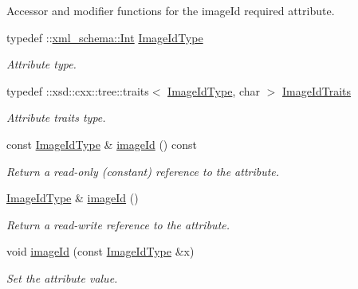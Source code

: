 Accessor and modifier functions for the imageId required attribute. \begin{DoxyCompactItemize}
\item 
\hypertarget{classopenstack_1_1xml_1_1Rebuild_a8896fc0d560d689eedce7af71136c4dc}{
typedef ::\hyperlink{namespacexml__schema_a12d975a13061c938969b2b5143e97645}{xml\_\-schema::Int} \hyperlink{classopenstack_1_1xml_1_1Rebuild_a8896fc0d560d689eedce7af71136c4dc}{ImageIdType}}
\label{classopenstack_1_1xml_1_1Rebuild_a8896fc0d560d689eedce7af71136c4dc}

\begin{DoxyCompactList}\small\item\em Attribute type. \item\end{DoxyCompactList}\item 
\hypertarget{classopenstack_1_1xml_1_1Rebuild_a8d342733a631b55058f8ddea8ba63561}{
typedef ::xsd::cxx::tree::traits$<$ \hyperlink{classopenstack_1_1xml_1_1Rebuild_a8896fc0d560d689eedce7af71136c4dc}{ImageIdType}, char $>$ \hyperlink{classopenstack_1_1xml_1_1Rebuild_a8d342733a631b55058f8ddea8ba63561}{ImageIdTraits}}
\label{classopenstack_1_1xml_1_1Rebuild_a8d342733a631b55058f8ddea8ba63561}

\begin{DoxyCompactList}\small\item\em Attribute traits type. \item\end{DoxyCompactList}\item 
const \hyperlink{classopenstack_1_1xml_1_1Rebuild_a8896fc0d560d689eedce7af71136c4dc}{ImageIdType} \& \hyperlink{classopenstack_1_1xml_1_1Rebuild_a6ba1573b2284d15ef512a968f36c9eb9}{imageId} () const 
\begin{DoxyCompactList}\small\item\em Return a read-\/only (constant) reference to the attribute. \item\end{DoxyCompactList}\item 
\hyperlink{classopenstack_1_1xml_1_1Rebuild_a8896fc0d560d689eedce7af71136c4dc}{ImageIdType} \& \hyperlink{classopenstack_1_1xml_1_1Rebuild_a1238a297551b64acda5cdaa2a8f90468}{imageId} ()
\begin{DoxyCompactList}\small\item\em Return a read-\/write reference to the attribute. \item\end{DoxyCompactList}\item 
void \hyperlink{classopenstack_1_1xml_1_1Rebuild_af13681a99b56e471c4dd9597008c25e1}{imageId} (const \hyperlink{classopenstack_1_1xml_1_1Rebuild_a8896fc0d560d689eedce7af71136c4dc}{ImageIdType} \&x)
\begin{DoxyCompactList}\small\item\em Set the attribute value. \item\end{DoxyCompactList}\end{DoxyCompactItemize}
